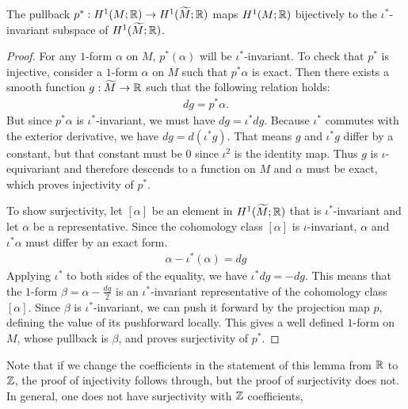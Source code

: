 \begin{lem}
  \label{lem:injective}
  The pullback $p^{\ast}:H^1(M;\mathbb{R})\rightarrow H^1(\widetilde{M};\mathbb{R})$ maps $H^1(M; \mathbb{R})$ bijectively to the $\iota^{\ast}$-invariant subspace of   $H^1(\widetilde{M}; \mathbb{R})$.
\end{lem}
\begin{proof}
  For any $1$-form $\alpha$ on $M$, $p^{\ast}(\alpha)$ will be $\iota^{\ast}$-invariant.
  To check that $p^\ast$ is injective, consider a $1$-form $\alpha$ on $M$ such that $p^{\ast}\alpha$ is exact.
  Then there exists a smooth function $g:\widetilde{M} \to \mathbb{R}$ such that the following relation holds:
    \begin{align*}
        dg = p^{\ast} \alpha.
    \end{align*}
    But since $p^{\ast}\alpha$ is $\iota^{\ast}$-invariant, we must have $dg = \iota^{\ast} dg$.
    Because $\iota^\ast$ commutes with the exterior derivative, we have $dg = d(\iota^{\ast}g)$.
    That means $g$ and $\iota^{\ast}g$ differ by a constant, but that constant must be $0$ since $\iota^2$ is the identity map.
    Thus $g$ is $\iota$-equivariant and therefore descends to a function on $M$ and $\alpha$ must be exact, which proves injectivity of $p^{\ast}$.

    To show surjectivity, let $[\alpha]$ be an element in $H^1(\widetilde{M}; \mathbb{R})$ that is $\iota^{\ast}$-invariant and let $\alpha$ be a representative.
    Since the cohomology class $[\alpha]$ is $\iota$-invariant, $\alpha$ and $\iota^{\ast}\alpha$ must differ by an exact form.
    \begin{align*}
        \alpha - \iota^{\ast}(\alpha) = dg
    \end{align*}
    Applying $\iota^\ast$ to both sides of the equality, we have $\iota^{\ast}dg = -dg$.
    This means that the $1$-form $\beta = \alpha - \frac{dg}{2}$ is an $\iota^{\ast}$-invariant representative of the cohomology class $[\alpha]$.
    Since $\beta$ is $\iota^{\ast}$-invariant, we can push it forward by the projection map $p$, defining the value of its pushforward locally.
    This gives a well defined $1$-form on $M$, whose pullback is $\beta$, and proves surjectivity of $p^{\ast}$.
\end{proof}
\begin{rem}
  Note that if we change the coefficients in the statement of this lemma from $\mathbb{R}$ to $\mathbb{Z}$, the proof of injectivity follows through, but the proof of surjectivity does not.
  {\color{red} In general, one does not have surjectivity with $\mathbb{Z}$ coefficients, }
\end{rem}

